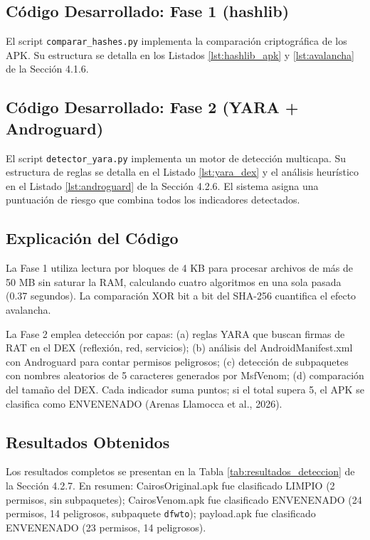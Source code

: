 \documentclass[12pt,a4paper]{article}
\begin{document}
\subsection{Código Desarrollado: Fase 1 (hashlib)}

El script \texttt{comparar\_hashes.py} implementa la comparación
criptográfica de los APK. Su estructura se detalla en los Listados
\ref{lst:hashlib_apk} y \ref{lst:avalancha} de la Sección 4.1.6.

\subsection{Código Desarrollado: Fase 2 (YARA + Androguard)}

El script \texttt{detector\_yara.py} implementa un motor de detección
multicapa. Su estructura de reglas se detalla en el Listado
\ref{lst:yara_dex} y el análisis heurístico en el Listado
\ref{lst:androguard} de la Sección 4.2.6. El sistema asigna una
puntuación de riesgo que combina todos los indicadores detectados.

\subsection{Explicación del Código}

La Fase 1 utiliza lectura por bloques de 4 KB para procesar archivos de
más de 50 MB sin saturar la RAM, calculando cuatro algoritmos en una
sola pasada (0.37 segundos). La comparación XOR bit a bit del SHA-256
cuantifica el efecto avalancha.

La Fase 2 emplea detección por capas: (a) reglas YARA que buscan firmas
de RAT en el DEX (reflexión, red, servicios); (b) análisis del
AndroidManifest.xml con Androguard para contar permisos peligrosos; (c)
detección de subpaquetes con nombres aleatorios de 5 caracteres
generados por MsfVenom; (d) comparación del tamaño del DEX. Cada
indicador suma puntos; si el total supera 5, el APK se clasifica como
ENVENENADO (Arenas Llamocca et al., 2026).

\subsection{Resultados Obtenidos}

Los resultados completos se presentan en la Tabla
\ref{tab:resultados_deteccion} de la Sección 4.2.7. En resumen:
CairosOriginal.apk fue clasificado LIMPIO (2 permisos, sin subpaquetes);
CairosVenom.apk fue clasificado ENVENENADO (24 permisos, 14 peligrosos,
subpaquete \texttt{dfwto}); payload.apk fue clasificado ENVENENADO (23
permisos, 14 peligrosos).
\end{document}
